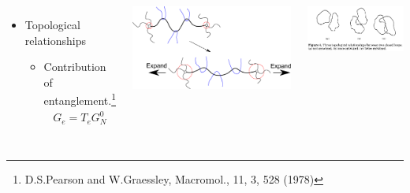 \documentclass[12pt, dvipdfmx]{beamer}
\begin{document}
\begin{frame}
\begin{columns}[totalwidth=1\textwidth]
\begin{itemize}
					\item Topological relationships
					\begin{itemize}
						\item Contribution of entanglement.\footnote{\tiny{D.S.Pearson and W.Graessley, Macromol., 11, 3, 528 (1978)}}
						\vspace{-2mm}
						\scriptsize
						\begin{align*}
							G_e = T_e G_N^0
						\end{align*}
					\end{itemize}
				\end{itemize}
				\vspace{-2mm}
				\includegraphics[width=\textwidth]{Constrained_Juntion.pdf}

				\vspace{3mm}
				\includegraphics[width=\textwidth]{topological_effect_ring.png}
			\end{columns}
\end{frame}
\end{document}
